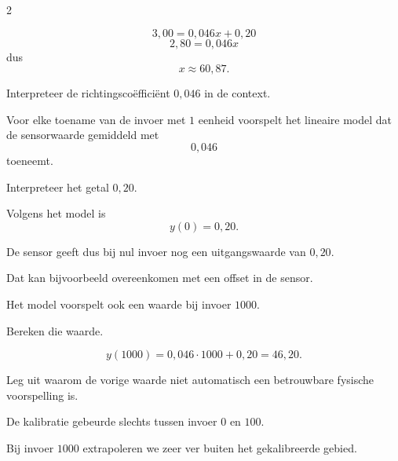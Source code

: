 \documentclass{ximera}
\begin{document}
\begin{oefening}{\oefG}
\begin{multicols}{2}
\begin{question}
    \begin{oplossing}
    \[
    3{,}00
    =0{,}046x+0{,}20
    \]
    \[
    2{,}80
    =0{,}046x
    \]
    dus
    \[
    x\approx60{,}87.
    \]
    \end{oplossing}
    \end{question}
    
    
    \begin{question}
    Interpreteer de richtingscoëfficiënt $0{,}046$ in de context.
    
    \begin{oplossing}
    Voor elke toename van de invoer met $1$ eenheid voorspelt het lineaire model dat de sensorwaarde gemiddeld met
    \[
    0{,}046
    \]
    toeneemt.
    \end{oplossing}
    \end{question}
    
    
    \begin{question}
    Interpreteer het getal $0{,}20$.
    
    \begin{oplossing}
    Volgens het model is
    \[
    y(0)=0{,}20.
    \]
    
    De sensor geeft dus bij nul invoer nog een uitgangswaarde van $0{,}20$.
    
    Dat kan bijvoorbeeld overeenkomen met een offset in de sensor.
    \end{oplossing}
    \end{question}
    
    
    \begin{question}
    Het model voorspelt ook een waarde bij invoer $1000$.
    
    Bereken die waarde.
    
    \begin{oplossing}
    \[
    y(1000)
    =0{,}046\cdot1000+0{,}20
    =46{,}20.
    \]
    \end{oplossing}
    \end{question}
    
    
    \begin{question}
    Leg uit waarom de vorige waarde niet automatisch een betrouwbare fysische voorspelling is.
    
    \begin{oplossing}
    De kalibratie gebeurde slechts tussen invoer $0$ en $100$.
    
    Bij invoer $1000$ extrapoleren we zeer ver buiten het gekalibreerde gebied.
    

\end{oplossing}
\end{question}
\end{multicols}
\end{oefening}
\end{document}
